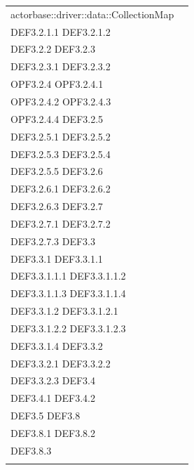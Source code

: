 \documentclass{scalatekids-article}
\begin{document}
\begin{longtable}[H]{|p{11.5cm}|p{5.5cm}|}
actorbase::driver::data::CollectionMap & \multiLineCell[t]{DEF3.2 DEF3.2.1\\DEF3.2.1.1 DEF3.2.1.2\\DEF3.2.2 DEF3.2.3\\DEF3.2.3.1 DEF3.2.3.2\\OPF3.2.4 OPF3.2.4.1\\OPF3.2.4.2 OPF3.2.4.3\\OPF3.2.4.4 DEF3.2.5\\DEF3.2.5.1 DEF3.2.5.2\\DEF3.2.5.3 DEF3.2.5.4\\DEF3.2.5.5 DEF3.2.6\\DEF3.2.6.1 DEF3.2.6.2\\DEF3.2.6.3 DEF3.2.7\\DEF3.2.7.1 DEF3.2.7.2\\DEF3.2.7.3 DEF3.3\\DEF3.3.1 DEF3.3.1.1\\DEF3.3.1.1.1 DEF3.3.1.1.2\\DEF3.3.1.1.3 DEF3.3.1.1.4\\DEF3.3.1.2 DEF3.3.1.2.1\\DEF3.3.1.2.2 DEF3.3.1.2.3\\DEF3.3.1.4 DEF3.3.2\\DEF3.3.2.1 DEF3.3.2.2\\DEF3.3.2.3 DEF3.4\\DEF3.4.1 DEF3.4.2\\DEF3.5 DEF3.8\\DEF3.8.1 DEF3.8.2\\DEF3.8.3\\}\\
\hline
\end{longtable}
\end{document}
